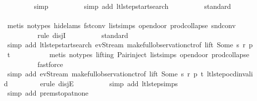 \begin{isabellebody}
\ \ \ \ \ \ \ \isamarkupfalse%
\ simp\isanewline
\ \ \ \ \ \ \ \ \isamarkupfalse%
\ {\isacharparenleft}simp\ add{\isacharcolon}\ ltl{\isacharunderscore}step{\isacharunderscore}startsearch{\isacharparenright}\isanewline
\ \ \ \ \ \ \ \ \isamarkupfalse%
\ standard\isanewline
\ \ \ \ \ \ \ \isamarkupfalse%
\ {\isacharparenleft}metis\ {\isacharparenleft}no{\isacharunderscore}types{\isacharcomma}\ hide{\isacharunderscore}lams{\isacharparenright}\ fst{\isacharunderscore}conv\ list{\isachardot}simps{\isacharparenleft}{}{\isacharparenright}\ opendoor{\isacharunderscore}{}\ prod{\isachardot}collapse\ snd{\isacharunderscore}conv{\isacharparenright}\isanewline
\ \ \ \ \ \ \ \ \isamarkupfalse%
\ {\isacharparenleft}rule\ disjI{}{\isacharparenright}\isanewline
\ \ \ \ \ \ \ \ \isamarkupfalse%
\ standard\isanewline
\ \ \ \ \ \ \ \ \ \isamarkupfalse%
\ {\isacharparenleft}simp\ add{\isacharcolon}\ ltl{\isacharunderscore}step{\isacharunderscore}startsearch\ ev{\isacharunderscore}Stream\ make{\isacharunderscore}full{\isacharunderscore}observation{\isachardot}ctr{\isacharbrackleft}of\ lift\ {\isachardoublequoteopen}Some\ s{\isachardoublequoteclose}\ r\ p\ t{\isacharbrackright}{\isacharparenright}\isanewline
\ \ \ \ \ \ \ \ \ \isamarkupfalse%
\ {\isacharparenleft}metis\ {\isacharparenleft}no{\isacharunderscore}types{\isacharcomma}\ lifting{\isacharparenright}\ Pair{\isacharunderscore}inject\ list{\isachardot}simps{\isacharparenleft}{}{\isacharparenright}\ opendoor{\isacharunderscore}{}\ prod{\isachardot}collapse{\isacharparenright}\isanewline
\ \ \ \ \ \ \ \ \isamarkupfalse%
\ fastforce\isanewline
\ \ \ \ \ \ \ \isamarkupfalse%
\ {\isacharparenleft}simp\ add{\isacharcolon}\ ev{\isacharunderscore}Stream\ make{\isacharunderscore}full{\isacharunderscore}observation{\isachardot}ctr{\isacharbrackleft}of\ lift\ {\isachardoublequoteopen}Some\ s{\isachardoublequoteclose}\ r\ p\ t{\isacharbrackright}\ ltl{\isacharunderscore}step{\isacharunderscore}ocd{\isacharunderscore}invalid{\isacharparenright}\isanewline
\ \ \ \ \ \ \ \isamarkupfalse%
\ {\isacharparenleft}erule\ disjE{\isacharparenright}\isanewline
\ \ \ \ \ \ \ \ \isamarkupfalse%
\ {\isacharparenleft}simp\ add{\isacharcolon}\ ltl{\isacharunderscore}step{\isachardot}simps{\isacharparenright}\isanewline
\ \ \ \ \ \ \ \isamarkupfalse%
\ {\isacharparenleft}simp\ add{\isacharcolon}\ prem{\isacharunderscore}stop{\isacharunderscore}at{\isacharunderscore}none{\isacharparenright}\isanewline

\end{isabellebody}
